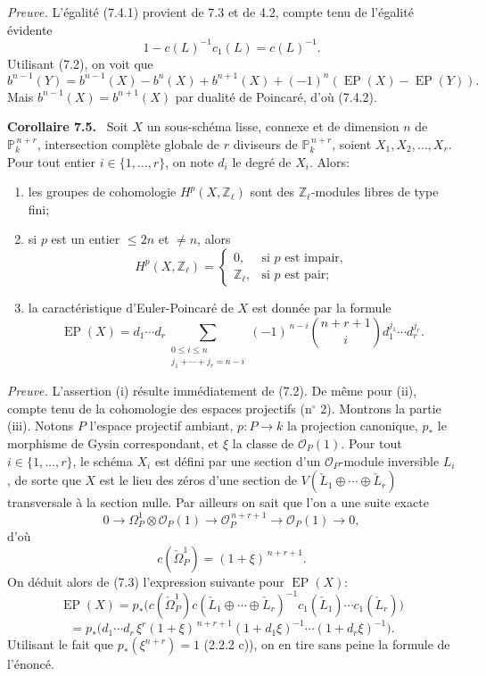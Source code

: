 \documentclass[11pt]{article}
\newenvironment{statement}[1]{\par\medskip\noindent\textbf{#1.}\ }{\par\medskip}
\begin{document}
\emph{Preuve.} L'égalité (7.4.1) provient de 7.3 et de 4.2, compte tenu de l'égalité évidente
\[
1-c(L)^{-1}c_1(L)=c(L)^{-1}.
\]
Utilisant (7.2), on voit que
\[
b^{n-1}(Y)=b^{n-1}(X)-b^n(X)+b^{n+1}(X)+(-1)^n(\operatorname{EP}(X)-\operatorname{EP}(Y)).
\]
Mais $b^{n-1}(X)=b^{n+1}(X)$ par dualité de Poincaré, d'où (7.4.2).

\begin{statement}{Corollaire 7.5}
Soit $X$ un sous-schéma lisse, connexe et de dimension $n$ de $\mathbb P_k^{\,n+r}$, intersection complète globale de $r$ diviseurs de $\mathbb P_k^{\,n+r}$, soient $X_1,X_2,\ldots,X_r$. Pour tout entier $i\in\{1,\ldots,r\}$, on note $d_i$ le degré de $X_i$. Alors:
\begin{enumerate}[label=(\roman*)]
\item les groupes de cohomologie $H^p(X,\mathbb Z_\ell)$ sont des $\mathbb Z_\ell$-modules libres de type fini;
\item si $p$ est un entier $\le 2n$ et $\ne n$, alors
\[
H^p(X,\mathbb Z_\ell)=
\begin{cases}
0,&\text{si }p\text{ est impair},\\
\mathbb Z_\ell,&\text{si }p\text{ est pair};
\end{cases}
\]
\item la caractéristique d'Euler-Poincaré de $X$ est donnée par la formule
\[
\operatorname{EP}(X)
=d_1\cdots d_r
\sum_{\substack{0\le i\le n\\ j_1+\cdots+j_r=n-i}}
(-1)^{\,n-i}\binom{n+r+1}{i}
d_1^{j_1}\cdots d_r^{j_r}.
\]
\end{enumerate}
\end{statement}

\emph{Preuve.} L'assertion (i) résulte immédiatement de (7.2). De même pour (ii), compte tenu de la cohomologie des espaces projectifs (n$^\circ$ 2). Montrons la partie (iii). Notons $P$ l'espace projectif ambiant, $p:P\to k$ la projection canonique, $p_*$ le morphisme de Gysin correspondant, et $\xi$ la classe de $\mathcal O_P(1)$. Pour tout $i\in\{1,\ldots,r\}$, le schéma $X_i$ est défini par une section d'un $\mathcal O_P$-module inversible $L_i$, de sorte que $X$ est le lieu des zéros d'une section de $V(\check L_1\oplus\cdots\oplus\check L_r)$ transversale à la section nulle. Par ailleurs on sait que l'on a une suite exacte
\[
0\to\Omega_P^1\otimes\mathcal O_P(1)\to\mathcal O_P^{\,n+r+1}\to\mathcal O_P(1)\to0,
\]
d'où
\[
c(\check\Omega_P^1)=(1+\xi)^{\,n+r+1}.
\]
On déduit alors de (7.3) l'expression suivante pour $\operatorname{EP}(X)$:
\[
\operatorname{EP}(X)
=p_*\bigl(c(\check\Omega_P^1)c(\check L_1\oplus\cdots\oplus\check L_r)^{-1}
c_1(\check L_1)\cdots c_1(\check L_r)\bigr)
\]
\[
=p_*\bigl(d_1\cdots d_r\,\xi^r(1+\xi)^{\,n+r+1}
(1+d_1\xi)^{-1}\cdots(1+d_r\xi)^{-1}\bigr).
\]
Utilisant le fait que $p_*(\xi^{n+r})=1$ (2.2.2 c)), on en tire sans peine la formule de l'énoncé.
\end{document}
